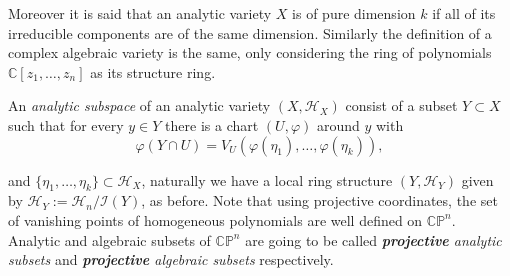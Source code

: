 \documentclass[12pt,twoside,a4paper]{report}
\newcommand{\co}{\ensuremath{\mathbb C }}
\newcommand{\cp}{\ensuremath{\mathbb{CP}}}
\begin{document}
Moreover it is said that an analytic variety $X$ is of pure dimension $k$ if all of its irreducible components are of the same dimension. Similarly the definition of a complex algebraic variety is the same, only considering the ring of polynomials $\co[z_{1},\dots,z_{n}]$ as its structure ring.

An \emph{analytic subspace} of an analytic variety $(X,\mathcal{H}_{X})$ consist of a subset $Y\subset X$ such that for every $y\in Y$ there is a chart $(U,\varphi)$ around $y$ with
\[
  \varphi(Y\cap U)=V_U(\varphi(\eta_1),\dots,\varphi(\eta_k)),
\]

\noindent and $\lbrace\eta_1,\dots,\eta_k\rbrace\subset\mathcal{H}_{X}$, naturally we have a local ring structure $(Y,\mathcal{H}_{Y})$ given by $\mathcal{H}_Y:=\mathcal{H}_n/\mathcal{I}(Y)$, as before.
Note that using projective coordinates, the set of vanishing points of homogeneous polynomials are well defined on $\cp^n$. Analytic and algebraic subsets of $\cp^n$ are going to be called  \emph{\textbf{projective} analytic subsets} and \emph{\textbf{projective} algebraic subsets} respectively.
\end{document}
